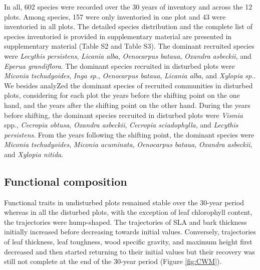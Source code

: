\documentclass[fleqn,10pt]{ArtEcoFoG} %
\begin{document}
In all, 602 species were recorded over the 30 years of inventory and across the 12 plots. Among species, 157 were only inventoried in one plot and 43 were inventoried in all plots.
The detailed species distribution and the complete list of species inventoried is provided in supplementary material are presented in supplementary material (Table S2 and Table S3). The dominant recruited species were \emph{Lecythis persistens}, \emph{Licania alba}, \emph{Oenocarpus bataua}, \emph{Oxandra asbeckii}, and \emph{Eperua grandiflora}.
The dominant species recruited in disturbed plots were \emph{Miconia tschudyoides}, \emph{Inga sp.}, \emph{Oenocarpus bataua}, \emph{Licania alba}, and \emph{Xylopia sp.}.
We besides analyZed the dominant species of recruited communities in disturbed plots, considering for each plot the years before the shifting point on the one hand, and the years after the shifting point on the other hand.
During the years before shifting, the dominant species recruited in disturbed plots were \emph{Vismia} spp., \emph{Cecropia obtusa}, \emph{Oxandra asbeckii}, \emph{Cecropia sciadophylla}, and \emph{Lecythis persistens}. From the years following the shifting point, the dominant species were \emph{Miconia tschudyoides}, \emph{Miconia acuminata}, \emph{Oenocarpus bataua}, \emph{Oxandra asbeckii}, and \emph{Xylopia nitida}.

\hypertarget{functional-composition}{%
\subsection{Functional composition}\label{functional-composition}}

Functional traits in undisturbed plots remained stable over the 30-year period whereas in all the disturbed plots, with the exception of leaf chlorophyll content, the trajectories were hump-shaped. The trajectories of SLA and bark thickness initially increased before decreasing towards initial values. Conversely, trajectories of leaf thickness, leaf toughness, wood specific gravity, and maximum height first decreased and then started returning to their initial values but their recovery was still not complete at the end of the 30-year period (Figure \ref{fig:CWM}).
\end{document}
